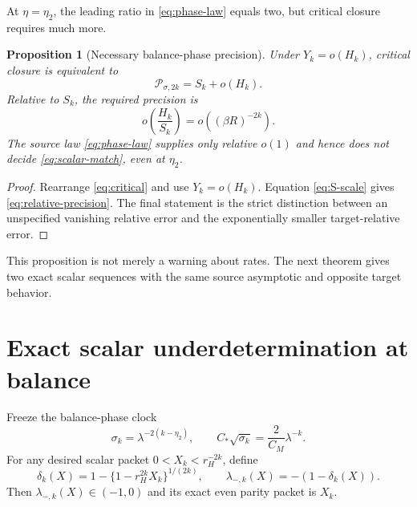 \documentclass[11pt]{article}
\newtheorem{proposition}[theorem]{Proposition}
\theoremstyle{remark}
\newcommand{\cP}{\mathcal P}
\begin{document}
At $\eta=\eta_2$, the leading ratio in \eqref{eq:phase-law} equals two, but
critical closure requires much more.

\begin{proposition}[Necessary balance-phase precision]
\label{prop:precision}
Under $Y_k=o(H_k)$, critical closure is equivalent to
\begin{equation}\label{eq:scalar-match}
 \cP_{\sigma,2k}=S_k+o(H_k).
\end{equation}
Relative to $S_k$, the required precision is
\begin{equation}\label{eq:relative-precision}
 o\!\left(\frac{H_k}{S_k}\right)
 =o\!\left((\beta R)^{-2k}\right).
\end{equation}
The source law \eqref{eq:phase-law} supplies only relative $o(1)$ and hence
does not decide \eqref{eq:scalar-match}, even at $\eta_2$.
\end{proposition}

\begin{proof}
Rearrange \eqref{eq:critical} and use $Y_k=o(H_k)$.  Equation
\eqref{eq:S-scale} gives \eqref{eq:relative-precision}.  The final statement
is the strict distinction between an unspecified vanishing relative error
and the exponentially smaller target-relative error.
\end{proof}

This proposition is not merely a warning about rates.  The next theorem gives
two exact scalar sequences with the same source asymptotic and opposite
target behavior.

\section{Exact scalar underdetermination at balance}

Freeze the balance-phase clock
\begin{equation}\label{eq:sigma-balance}
 \sigma_k=\lambda^{-2(k-\eta_2)},
 \qquad
 C_*\sqrt{\sigma_k}=\frac2{C_M}\lambda^{-k}.
\end{equation}
For any desired scalar packet $0<X_k<r_H^{-2k}$, define
\begin{equation}\label{eq:inverse-parity}
 \delta_k(X)=1-\{1-r_H^{2k}X_k\}^{1/(2k)},
 \qquad
 \lambda_{-,k}(X)=-(1-\delta_k(X)).
\end{equation}
Then $\lambda_{-,k}(X)\in(-1,0)$ and its exact even parity packet is $X_k$.
\end{document}
